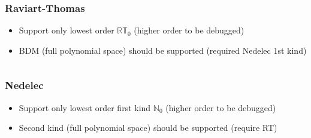 \begin{frame}[fragile]
  \frametitle{Raviart-Thomas}
  \begin{itemize}
  \item Support only lowest order $\mathbb{R}\mathbb{T}_0$ (higher order to be debugged)
  \item BDM (full polynomial space) should be supported
    (required Nedelec 1st kind)
  \end{itemize}
  \inputminted[fontsize=\scriptsize]{c++}{Codes/prudhomme/fud4/rt.cpp}
\end{frame}

\begin{frame}[fragile]
  \frametitle{Nedelec}
  \begin{itemize}
  \item Support only  lowest order first kind $\mathbb{N}_0$ (higher order to be
    debugged)
  \item Second kind (full polynomial space) should be supported
    (require RT)
  \end{itemize}
  \inputminted[fontsize=\scriptsize]{c++}{Codes/prudhomme/fud4/ned.cpp}
\end{frame}

